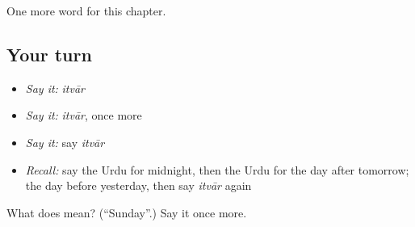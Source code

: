 \begin{grammarlens}[title={What you've built}]
One more word for this chapter.
\end{grammarlens}

\subsection*{Your turn}
\begin{itemize}
\raggedright
  \item \emph{Say it:} \emph{itvār}
  \item \emph{Say it:} \emph{itvār}, once more
  \item \emph{Say it:} say \emph{itvār}
  \item \emph{Recall:} say the Urdu for midnight, then the Urdu for the day after tomorrow; the day before yesterday, then say \emph{itvār} again
\end{itemize}

\begin{tcolorbox}[breakable,colback=teal!4,colframe=teal!35!black,title={Before you move on}]
What does  mean? (\textquotedblleft{}Sunday\textquotedblright{}.) Say it once more.
\end{tcolorbox}
